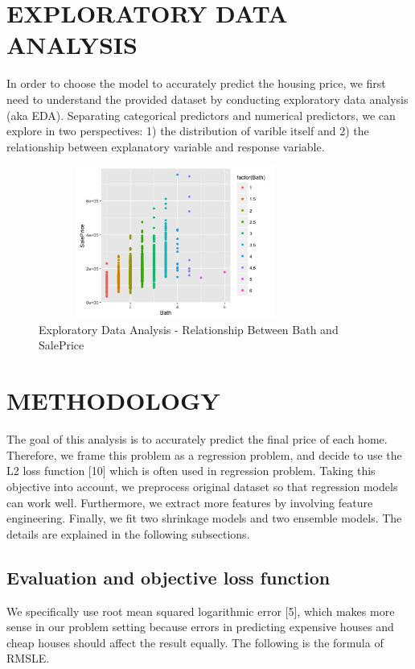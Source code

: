 \documentclass[letterpaper, 10 pt, conference]{ieeeconf}  %
\begin{document}
\section{EXPLORATORY DATA ANALYSIS}
In order to choose the model to accurately predict the housing price, we first need to understand the provided dataset by conducting exploratory data analysis (aka EDA). Separating categorical predictors and numerical predictors, we can explore in two perspectives: 1) the distribution of varible itself and 2) the relationship between explanatory variable and response variable. 
   \begin{figure}[thpb]
      \centering
      \includegraphics[width =  9cm, height = 5cm]{../images/eda-bath-vs-sale.png}
      \caption{Exploratory Data Analysis - Relationship Between Bath and SalePrice}
      \label{figurelabel}
   \end{figure}

\section{METHODOLOGY}

The goal of this analysis is to accurately predict the final price of each home. Therefore, we frame this problem as a regression problem, and decide to use the L2 loss function [10] which is often used in regression problem. Taking this objective into account, we preprocess original dataset so that regression models can work well. Furthermore, we extract more features by involving feature engineering. Finally, we fit two shrinkage models and two ensemble models. The details are explained in the following subsections.

\subsection{Evaluation and objective loss function}

We specifically use root mean squared logarithmic error [5], which makes more sense in our problem setting because errors in predicting expensive houses and cheap houses should affect the result equally. The following is the formula of RMSLE.
\end{document}
